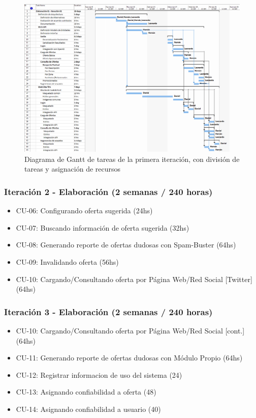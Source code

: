 \begin{figure}[hbtp]
\centering
\includegraphics[height=0.75\textheight,angle=90]{TP2Planificacion}
\caption{Diagrama de Gantt de tareas de la primera iteraci\'on, con divisi\'on de tareas y asignaci\'on de recursos}
\label{fig:gantt}
\end{figure}

\subsubsection{Iteraci\'on 2 - Elaboraci\'on (2 semanas / 240 horas)}
	
	\begin{itemize}
	  \item CU-06: Configurando oferta sugerida (24hs)
	  \item CU-07: Buscando información de oferta sugerida (32hs)
	  \item CU-08: Generando reporte de ofertas dudosas con Spam-Buster (64hs)
	  \item CU-09: Invalidando oferta (56hs)
	  \item CU-10: Cargando/Consultando oferta por P\'agina Web/Red Social [Twitter] (64hs)
	\end{itemize}

\subsubsection{Iteraci\'on 3 - Elaboraci\'on (2 semanas / 240 horas)}
	
	\begin{itemize}
		\item CU-10: Cargando/Consultando oferta por P\'agina Web/Red Social [cont.] (64hs)
		\item CU-11: Generando reporte de ofertas dudosas con M\'odulo Propio (64hs)
		\item CU-12: Registrar informacion de uso del sistema (24)
		\item CU-13: Asignando confiabilidad a oferta (48)
		\item CU-14: Asignando confiabilidad a usuario (40)
	\end{itemize}

